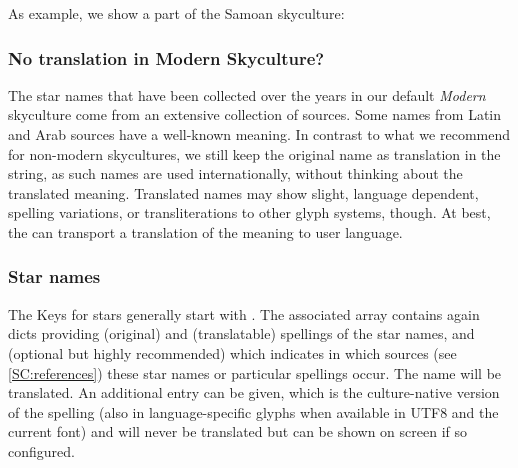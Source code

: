 As example, we show a part of the Samoan skyculture:

\subsubsection{No translation in Modern Skyculture?}

The star names that have been collected over the years in our default \emph{Modern} skyculture come from an extensive collection of sources.
Some names from Latin and Arab sources have a well-known meaning.  
In contrast to what we recommend for non-modern skycultures, we still keep the original name as translation in the  string, 
as such names are used internationally, without thinking about the translated meaning. 
Translated names may show slight, language dependent, spelling variations, or transliterations to other glyph systems, though.
At best, the  can transport a translation of the meaning to user language. 

\subsubsection{Star names}


The Keys for stars generally start with . 
The associated array contains again dicts providing  (original) and 
 (translatable) spellings of the star names, 
and  (optional but highly recommended) which indicates 
in which sources (see \ref{SC:references}) these star names or particular spellings occur.
The  name will be translated. An additional  entry can be given, 
which is the culture-native version of the spelling 
(also in language-specific glyphs when available in UTF8 and the current font) and will never be translated but can be shown on screen if so configured.


